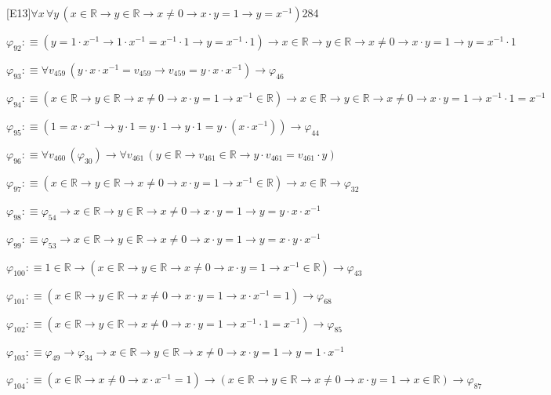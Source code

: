 \begin{fullproof}{[E13]}{$\forall x\,\forall y\,(x \in \mathbb{R} \to y \in \mathbb{R} \to x \neq 0 \to x \cdot y = 1 \to y = x^{-1})$}{284}
\begin{abbrevlist}
\item $\varphi_{92} :\equiv (y = 1 \cdot x^{-1} \to 1 \cdot x^{-1} = x^{-1} \cdot 1 \to y = x^{-1} \cdot 1) \to x \in \mathbb{R} \to y \in \mathbb{R} \to x \neq 0 \to x \cdot y = 1 \to y = x^{-1} \cdot 1$
\item $\varphi_{93} :\equiv \forall v_{459}\,(y \cdot x \cdot x^{-1} = v_{459} \to v_{459} = y \cdot x \cdot x^{-1}) \to \varphi_{46}$
\item $\varphi_{94} :\equiv (x \in \mathbb{R} \to y \in \mathbb{R} \to x \neq 0 \to x \cdot y = 1 \to x^{-1} \in \mathbb{R}) \to x \in \mathbb{R} \to y \in \mathbb{R} \to x \neq 0 \to x \cdot y = 1 \to x^{-1} \cdot 1 = x^{-1}$
\item $\varphi_{95} :\equiv (1 = x \cdot x^{-1} \to y \cdot 1 = y \cdot 1 \to y \cdot 1 = y \cdot (x \cdot x^{-1})) \to \varphi_{44}$
\item $\varphi_{96} :\equiv \forall v_{460}\,(\varphi_{30}) \to \forall v_{461}\,(y \in \mathbb{R} \to v_{461} \in \mathbb{R} \to y \cdot v_{461} = v_{461} \cdot y)$
\item $\varphi_{97} :\equiv (x \in \mathbb{R} \to y \in \mathbb{R} \to x \neq 0 \to x \cdot y = 1 \to x^{-1} \in \mathbb{R}) \to x \in \mathbb{R} \to \varphi_{32}$
\item $\varphi_{98} :\equiv \varphi_{54} \to x \in \mathbb{R} \to y \in \mathbb{R} \to x \neq 0 \to x \cdot y = 1 \to y = y \cdot x \cdot x^{-1}$
\item $\varphi_{99} :\equiv \varphi_{53} \to x \in \mathbb{R} \to y \in \mathbb{R} \to x \neq 0 \to x \cdot y = 1 \to y = x \cdot y \cdot x^{-1}$
\item $\varphi_{100} :\equiv 1 \in \mathbb{R} \to (x \in \mathbb{R} \to y \in \mathbb{R} \to x \neq 0 \to x \cdot y = 1 \to x^{-1} \in \mathbb{R}) \to \varphi_{43}$
\item $\varphi_{101} :\equiv (x \in \mathbb{R} \to y \in \mathbb{R} \to x \neq 0 \to x \cdot y = 1 \to x \cdot x^{-1} = 1) \to \varphi_{68}$
\item $\varphi_{102} :\equiv (x \in \mathbb{R} \to y \in \mathbb{R} \to x \neq 0 \to x \cdot y = 1 \to x^{-1} \cdot 1 = x^{-1}) \to \varphi_{85}$
\item $\varphi_{103} :\equiv \varphi_{49} \to \varphi_{34} \to x \in \mathbb{R} \to y \in \mathbb{R} \to x \neq 0 \to x \cdot y = 1 \to y = 1 \cdot x^{-1}$
\item $\varphi_{104} :\equiv (x \in \mathbb{R} \to x \neq 0 \to x \cdot x^{-1} = 1) \to (x \in \mathbb{R} \to y \in \mathbb{R} \to x \neq 0 \to x \cdot y = 1 \to x \in \mathbb{R}) \to \varphi_{87}$

\end{abbrevlist}
\end{fullproof}
